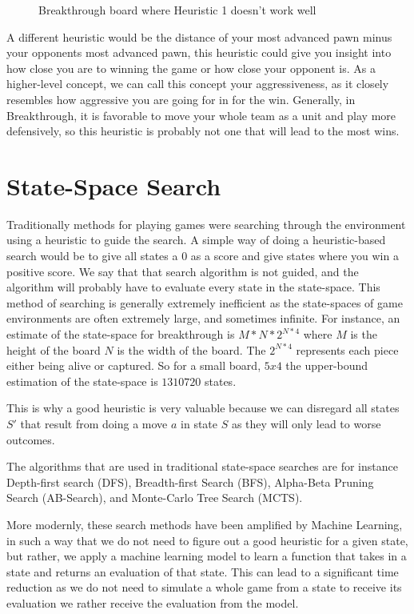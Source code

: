 \begin{figure}[]
  \centering
  \caption{Breakthrough board where Heuristic 1 doesn't work well}
  \label{fig:bt_h1_bad}
\end{figure}

A different heuristic would be the distance of your most advanced pawn minus your opponents most advanced pawn, this heuristic could give you insight into how close you are to winning the game or how close your opponent is. As a higher-level concept, we can call this concept your aggressiveness, as it closely resembles how aggressive you are going for in for the win. Generally, in Breakthrough, it is favorable to move your whole team as a unit and play more defensively, so this heuristic is probably not one that will lead to the most wins.

\section{State-Space Search}

Traditionally methods for playing games were searching through the environment using a heuristic to guide the search. A simple way of doing a heuristic-based search would be to give all states a $0$ as a score and give states where you win a positive score. We say that that search algorithm is not guided, and the algorithm will probably have to evaluate every state in the state-space. This method of searching is generally extremely inefficient as the state-spaces of game environments are often extremely large, and sometimes infinite. For instance, an estimate of the state-space for breakthrough is $M * N * 2^{N*4}$ where $M$ is the height of the board $N$ is the width of the board. The $2^{N*4}$ represents each piece either being alive or captured. So for a small board, $5x4$ the upper-bound estimation of the state-space is $1310720$ states.

This is why a good heuristic is very valuable because we can disregard all states $S'$ that result from doing a move $a$ in state $S$ as they will only lead to worse outcomes.

The algorithms that are used in traditional state-space searches are for instance Depth-first search (DFS), Breadth-first Search (BFS), Alpha-Beta Pruning Search (AB-Search), and Monte-Carlo Tree Search (MCTS).

More modernly, these search methods have been amplified by Machine Learning, in such a way that we do not need to figure out a good heuristic for a given state, but rather, we apply a machine learning model to learn a function that takes in a state and returns an evaluation of that state. This can lead to a significant time reduction as we do not need to simulate a whole game from a state to receive its evaluation we rather receive the evaluation from the model.

